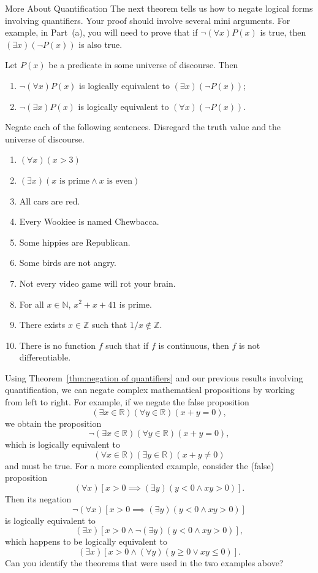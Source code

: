 \begin{section}{More About Quantification}
The next theorem tells us how to negate logical forms involving quantifiers. Your proof should involve several mini arguments. For example, in Part~(a), you will need to prove that if $\neg (\forall x)P(x)$ is true, then $(\exists x)(\neg P(x))$ is also true.

\begin{theorem}\label{thm:negation of quantifiers}
Let $P(x)$ be a predicate in some universe of discourse.  Then
\begin{enumerate}[label=\textrm{(\alph*)}]
\item $\neg (\forall x)P(x)$ is logically equivalent to $(\exists x)(\neg P(x))$;
\item $\neg (\exists x)P(x)$ is logically equivalent to $(\forall x)(\neg P(x))$.
\end{enumerate}
\end{theorem}

\begin{problem}
Negate each of the following sentences.  Disregard the truth value and the universe of discourse.
\begin{enumerate}[label=\textrm{(\alph*)}]
\item $(\forall x)(x>3)$
\item $(\exists x)(x \mbox{ is prime}\wedge x \mbox{ is even})$
\item All cars are red.
\item Every Wookiee is named Chewbacca.
\item Some hippies are Republican.
\item Some birds are not angry.
\item Not every video game will rot your brain.
\item For all $x\in\mathbb{N}$, $x^2+x+41$ is prime.
\item There exists $x\in\mathbb{Z}$ such that $1/x\notin\mathbb{Z}$.
\item There is no function $f$ such that if $f$ is continuous, then $f$ is not differentiable.
\end{enumerate}
\end{problem}

Using Theorem~\ref{thm:negation of quantifiers} and our previous results involving quantification, we can negate complex mathematical propositions by working from left to right. For example, if we negate the false proposition
\[
(\exists x\in\mathbb{R})(\forall y\in\mathbb{R})(x+y=0),
\]
we obtain the proposition
\[
\neg(\exists x\in\mathbb{R})(\forall y\in\mathbb{R})(x+y=0),
\]
which is logically equivalent to
\[
(\forall x\in\mathbb{R})(\exists y\in\mathbb{R})(x+y\neq 0)
\]
and must be true. For a more complicated example, consider the (false) proposition
\[
(\forall x)[x>0\implies (\exists y)(y<0 \wedge xy>0)].
\]
Then its negation
\[
\neg (\forall x)[x>0\implies (\exists y)(y<0 \wedge xy>0)]
\]
is logically equivalent to
\[
(\exists x)[x>0 \wedge \neg (\exists y)(y<0 \wedge xy>0)],
\]
which happens to be logically equivalent to
\[
(\exists x)[x>0 \wedge (\forall y)(y\geq 0 \vee xy\leq 0)].
\]
Can you identify the theorems that were used in the two examples above?


\end{section}
